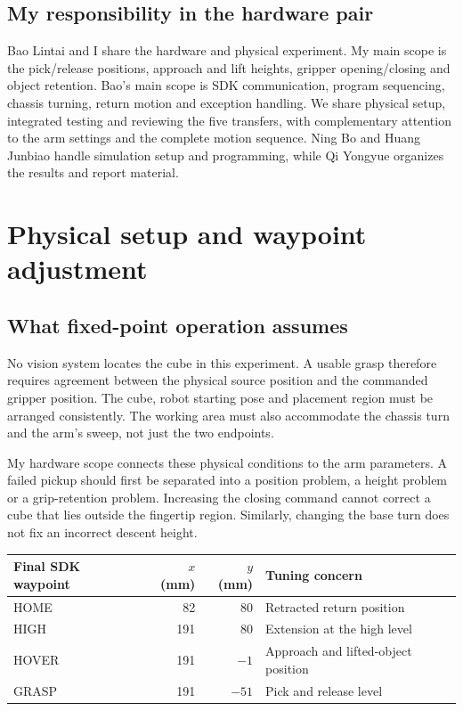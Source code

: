 
\newcommand{\studentname}{Xue Yutong}
\newcommand{\studentcn}{薛羽桐}
\newcommand{\studentid}{24020036072}

\commonrequirements
\subsection{My responsibility in the hardware pair}
Bao Lintai and I share the hardware and physical experiment. My main scope is the pick/release positions, approach and lift heights, gripper opening/closing and object retention. Bao's main scope is SDK communication, program sequencing, chassis turning, return motion and exception handling. We share physical setup, integrated testing and reviewing the five transfers, with complementary attention to the arm settings and the complete motion sequence. Ning Bo and Huang Junbiao handle simulation setup and programming, while Qi Yongyue organizes the results and report material.
\teamtable
\commonlimits
\section{Physical setup and waypoint adjustment}
\subsection{What fixed-point operation assumes}
No vision system locates the cube in this experiment. A usable grasp therefore requires agreement between the physical source position and the commanded gripper position. The cube, robot starting pose and placement region must be arranged consistently. The working area must also accommodate the chassis turn and the arm's sweep, not just the two endpoints.

My hardware scope connects these physical conditions to the arm parameters. A failed pickup should first be separated into a position problem, a height problem or a grip-retention problem. Increasing the closing command cannot correct a cube that lies outside the fingertip region. Similarly, changing the base turn does not fix an incorrect descent height.
\begin{center}
\begin{tabular}{@{}lrrl@{}}\toprule
Final SDK waypoint & $x$ (mm) & $y$ (mm) & Tuning concern\\\midrule
HOME & 82 & 80 & Retracted return position\\
HIGH & 191 & 80 & Extension at the high level\\
HOVER & 191 & $-1$ & Approach and lifted-object position\\
GRASP & 191 & $-51$ & Pick and release level\\\bottomrule
\end{tabular}
\end{center}
